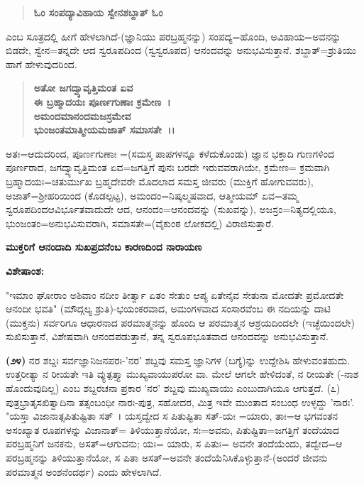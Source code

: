\begin{verse}
\textbf{ಓಂ ಸಂಪದ್ಯಾವಿಹಾಯ ಸ್ವೇನಶಬ್ದಾತ್ ಓಂ}
\end{verse}


\noindent
ಎಂಬ ಸೂತ್ರದಲ್ಲಿ ಹೀಗೆ ಹೇಳಲಾಗಿದೆ-(ಜ್ಞಾನಿಯು ಪರಬ್ರಹ್ಮನನ್ನು) ಸಂಪದ್ಯ=ಹೊಂದಿ, ಅವಿಹಾಯ=ಅವನನ್ನು ಬಿಡದೇ, ಸ್ವೇನ=ತನ್ನದೇ ಆದ ಸ್ವರೂಪದಿಂದ (ಸ್ವಸ್ವರೂಪದ) ಆನಂದವನ್ನು ಅನುಭವಿಸುತ್ತಾನೆ. ಶಬ್ದಾತ್=ಶ್ರುತಿಯು ಹಾಗೆ ಹೇಳುವುದರಿಂದ.

\begin{verse}
\textbf{ಅತೋ ಜಗದ್ವ್ಯಾವೃತ್ತಿಮಂತ ಏವ}\\\textbf{ಈ ಬ್ರಹ್ಮಾದಯಃ ಪೂರ್ಣಗುಣಾಃ ಕ್ರಮೇಣ~।}\\\textbf{ಅಮಂದಮಾನಂದಮಜಸ್ರಮೇವ}\\\textbf{ಭುಂಜಂತಮಾತ್ಮೀಯಮಜಾತ್ ಸಮಾಸತೇ~।।}
\end{verse}

ಅತಃ=ಆದುದರಿಂದ, ಪೂರ್ಣಗುಣಾಃ =(ಸಮಸ್ತ ಪಾಪಗಳನ್ನೂ ಕಳೆದುಕೊಂಡು) ಜ್ಞಾನ ಭಕ್ತಾದಿ ಗುಣಗಳಿಂದ ಪೂರ್ಣರಾದ, ಜಗದ್ವ್ಯಾವೃತ್ತಿಮಂತ ಏವ=ಜಗತ್ತಿಗೆ ಪುನಃ ಬರದೇ ಇರುವವರಾಗಿಯೇ, ಕ್ರಮೇಣ= ಕ್ರಮವಾಗಿ ಬ್ರಹ್ಮಾದಯಃ=ಚತುರ್ಮುಖ ಬ್ರಹ್ಮದೇವರೇ ಮೊದಲಾದ ಸಮಸ್ತ ಜೀವರು (ಮುಕ್ತಿಗೆ ಹೋಗುವವರು), ಅಜಾತ್=ಶ‍್ರೀಹರಿಯಿಂದ (ಕೊಡಲ್ಪಟ್ಟ), ಅಮಂದಂ=ನಿಷ್ಕಲ್ಮಷವಾದ, ಆತ್ಮೀಯಮ್ ಏವ=ತಮ್ಮ ಸ್ವರೂಪದಿಂದ\break ಆವಿರ್ಭೂತವಾದುದೇ ಆದ, ಆನಂದಂ=ಆನಂದವನ್ನು (ಸುಖವನ್ನು), ಅಜಸ್ರಂ=ನಿತ್ಯ\-ದಲ್ಲಿಯೂ, ಭುಂಜಂತಂ=ಅನುಭವಿಸುವರಾಗಿ, ಸಮಾಸತೇ=(ವೈಕುಂಠ ಲೋಕದಲ್ಲಿ) ವಿರಾಜಿ\-ಸುತ್ತಾರೆ.

\begin{center}
\textbf{ಮುಕ್ತರಿಗೆ ಆನಂದಾದಿ ಸುಖಪ್ರದನೆಂಬ ಕಾರಣದಿಂದ ನಾರಾಯಣ}
\end{center}

\noindent
\textbf{ವಿಶೇಷಾಂಶ:\enginline{-}}

"ಇಮಾಂ ಘೋರಾಂ ಅಶಿವಾಂ ನದೀಂ ತೀರ್ತ್ವಾ ಏತಂ ಸೇತುಂ ಆಪ್ಯ ಏತೇನೈವ ಸೇತುನಾ ಮೋದತೇ ಪ್ರಮೋದತೇ ಆನಂದೀ ಭವತಿ" (ಮೌದ್ಗಲ್ಯ ಶ್ರುತಿ)-ಭಯಂಕರವಾದ, ಅಮಂಗಳವಾದ ಸಂಸಾರವೆಂಬ ಈ ನದಿಯನ್ನು ದಾಟಿ (ಮುಕ್ತನು) ಸರ್ವರಿಗೂ ಆಧಾರನಾದ ಪರಮಾತ್ಮನನ್ನು ಹೊಂದಿ ಆ ಪರಮಾತ್ಮನ ಆಶ್ರಯದಿಂದಲೇ (ಇಚ್ಛೆಯಿಂದಲೇ) ಸುಖಿಸುತ್ತಾನೆ, ವಿಶೇಷವಾಗಿ ಆನಂದಪಡುತ್ತಾನೆ, ತನ್ನ ಸ್ವರೂಪಭೂತವಾದ ಆನಂದವನ್ನು ಅನುಭವಿಸುತ್ತಾನೆ.

\textbf{(೨೪)} ನರ ಶಬ್ದಃ ಸರ್ವಜ್ಞಾನಿಜನಪರಃ-'ನರ' ಶಬ್ದವು ಸಮಸ್ತ ಜ್ಞಾನಿಗಳ (ಬಗ್ಯೆ)ನ್ನು ಉದ್ದೇಶಿಸಿ ಹೇಳುವಂತಹುದು. ಉತ್ತರೀತ್ಯಾ ನ ರೀಯತೇ ಇತಿ ವ್ಯುತ್ಪತ್ತ್ಯಾ ಮುಖ್ಯವಾಯುಪರೋ ವಾ. ಮೇಲೆ ಆಗಲೇ ಹೇಳಿದಂತೆ, ನ ರೀಯತೇ (-ನಾಶ ಹೊಂದುವುದಿಲ್ಲ) ಎಂಬ ಶಬ್ದರಚನಾ ಪ್ರಕಾರ 'ನರ' ಶಬ್ದವು ಮುಖ್ಯವಾಯು ಎಂಬುದಾಗಿಯೂ ಆಗುತ್ತದೆ. (೭) ಪುತ್ರಭ್ರಾತೃಸಖಿತ್ವಾದಿನಾ ತತ್ಸಂಬಂಧೀ ನಾರಃ-ಪುತ್ರ, ಸಹೋದರ, ಮಿತ್ರ ಇವೇ ಮುಂತಾದ ಸಂಬಂಧ ಉಳ್ಳದ್ದು 'ನಾರಃ'. "ಯಸ್ತಾ ವಿಜಾನಾತ್ಸಪಿತುಷ್ಟಿತಾ ಸತ್~। ಯಸ್ತದ್ವೇದ ಸ ಪಿತುಷ್ಟಿತಾ ಸತ್-ಯಃ =ಯಾರು, ತಾಃ=ಆ ಭಗವಂತನ ಅಸಂಖ್ಯಾತ ರೂಪಗಳನ್ನು ವಿಜಾನಾತ್= ತಿಳಿಯುತ್ತಾನೆಯೋ, ಸಃ=ಅವನು, ಪಿತುಷ್ಟಿತಾ=ಜಗತ್ತಿಗೆ ತಂದೆಯಾದ ಪರಬ್ರಹ್ಮನಿಗೆ ಜನಕನು, ಅಸತ್=ಆಗುವನು; ಯಃ= ಯಾರು, ಸ ಪಿತುಃ= ಅವನೇ ತಂದೆಯೆಂದು, ತದ್ವೇದ=ಆ ಪರಬ್ರಹ್ಮನನ್ನು ತಿಳಿಯುತ್ತಾನೆಯೋ, ಸ ಪಿತಾ ಅಸತ್=ಅವನೇ ತಂದೆಯೆನಿಸಿ\-ಕೊಳ್ಳುತ್ತಾನೆ-(ಅಂದರೆ ಜೀವನು ಪರಮಾತ್ಮನ ಅಂಶನೆಂದರ್ಥ) ಎಂದು ಹೇಳಲಾಗಿದೆ.

